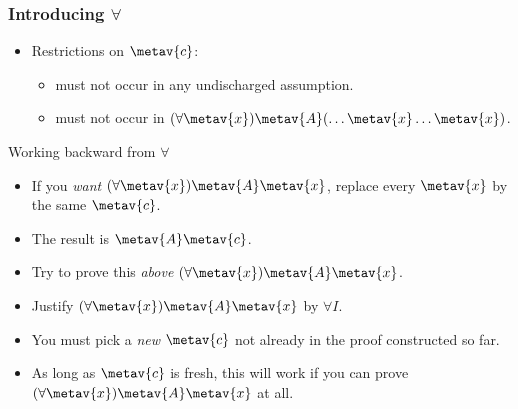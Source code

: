 \begin{frame}
  \frametitle{Introducing $\forall$}
  
  \begin{fitchproof}
     
  \end{fitchproof}

  \begin{itemize}[<+->]
  \item Restrictions on $\metav{c}$:
  \begin{itemize}
    \item must not occur in any undischarged assumption.
    \item must not occur in $\qt{\forall}{\metav{x}}\metav{A}(\ldots \metav{x} \ldots \metav{x})$.
  \end{itemize}
\end{itemize}
\end{frame}

\begin{frame}{Working backward from $\forall$}

  \begin{itemize}[<+->]
    \item If you \emph{want $\qt{\forall}{\metav{x}}\metav{A}\qv{\metav{x}}$}, replace every $\metav{x}$ by the
      same $\metav{c}$.
    \item The result is $\metav{A}\qv{\metav{c}}$. 
    \item Try to prove this \emph{above} $\qt{\forall}{\metav{x}}\metav{A}\qv{\metav{x}}$.
    \item Justify $\qt{\forall}{\metav{x}}\metav{A}\qv{\metav{x}}$ by $\forall I$.
    \item You must pick a \emph{new} $\metav{c}$ not already in the
    proof constructed so far.
    \item As long as $\metav{c}$ is fresh, this will work if you can
    prove $\qt{\forall}{\metav{x}}\metav{A}\qv{\metav{x}}$ at all.
    \end{itemize}
\end{frame}


